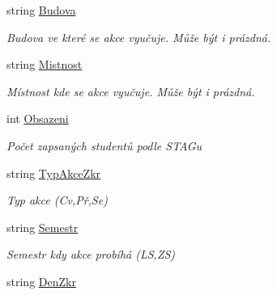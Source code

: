 \begin{DoxyCompactItemize}
string \hyperlink{class_analyza_rozvrhu_1_1_s_t_a_g___classes_1_1_rozvrhova_akce_a252f8cdf5c741494f65e0dc4acce9874}{Budova}
\begin{DoxyCompactList}\small\item\em Budova ve které se akce vyučuje. Může být i prázdná. \end{DoxyCompactList}\item 
string \hyperlink{class_analyza_rozvrhu_1_1_s_t_a_g___classes_1_1_rozvrhova_akce_a29049e57e8aa95240804e3395a538f3e}{Mistnost}
\begin{DoxyCompactList}\small\item\em Místnost kde se akce vyučuje. Může být i prázdná. \end{DoxyCompactList}\item 
int \hyperlink{class_analyza_rozvrhu_1_1_s_t_a_g___classes_1_1_rozvrhova_akce_ac3a97f7c09dd3108def81f7d854568c9}{Obsazeni}
\begin{DoxyCompactList}\small\item\em Počet zapsaných studentů podle S\+T\+A\+Gu \end{DoxyCompactList}\item 
string \hyperlink{class_analyza_rozvrhu_1_1_s_t_a_g___classes_1_1_rozvrhova_akce_a9118b865a4e3ab2a18fdcd3d7acafe92}{Typ\+Akce\+Zkr}
\begin{DoxyCompactList}\small\item\em Typ akce (Cv,Př,Se) \end{DoxyCompactList}\item 
string \hyperlink{class_analyza_rozvrhu_1_1_s_t_a_g___classes_1_1_rozvrhova_akce_a9c056171b79e82b47895d380631788a1}{Semestr}
\begin{DoxyCompactList}\small\item\em Semestr kdy akce probíhá (LS,ZS) \end{DoxyCompactList}\item 
string \hyperlink{class_analyza_rozvrhu_1_1_s_t_a_g___classes_1_1_rozvrhova_akce_abe9d4832749b0d41f2430ba5b5cb0bde}{Den\+Zkr}

\end{DoxyCompactItemize}
